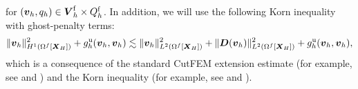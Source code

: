 \documentclass[11pt,reqno]{amsart}
\theoremstyle{definition}
\theoremstyle{plain}
\numberwithin{theorem}{section}
\numberwithin{proposition}{section}
\numberwithin{lemma}{section}
\numberwithin{equation}{section}
\newcommand{\bs}[1]{\boldsymbol{#1}}
\renewcommand{\(}{\bigl(}
\renewcommand{\)}{\bigr)}
\begin{document}
for $({\bs v}_h,q_h) \in \bs V_h^{\rm f}
\times  Q_h^{\rm f}$.
In addition, we will use the following Korn inequality with ghost-penalty terms: 
\begin{align}\label{Korn-inequlaity}
\|{\bs v}_h\|_{H^1(\Omega^f[{\bs X}_H])}^2 + g_h^{\rm u}({\bs v}_h,{\bs v}_h)
\lesssim
\|{\bs v}_h\|_{L^2(\Omega^f[{\bs X}_H])}^2
+
\|{\bs D}({\bs v}_h)\|_{L^2(\Omega^f[{\bs X}_H])}^2
+
g_h^{\rm u}({\bs v}_h,{\bs v}_h) ,
\end{align}
which is a consequence of the standard CutFEM extension estimate (for example, see 
\cite[Lemma~5.4, equations~(5.38)--(5.40)]{MassingSchottWall2018}
and
\cite[Lemma~4.1, equations~(4.3)--(4.4)]{BurmanClausMassing2015}) and the Korn inequality (for example, see 
\cite[equations~(5.13)--(5.17)]{MassingSchottWall2018}
and
\cite[equations~(4.10)--(4.12)]{BurmanClausMassing2015}).
\end{document}
